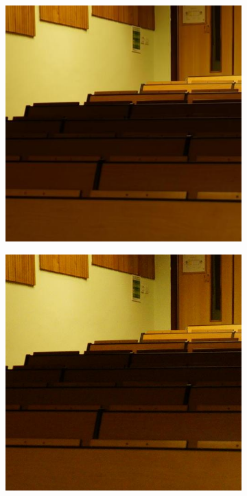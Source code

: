 \begin{figure}
    \hfill
    \begin{subfigure}[t]{0.24\textwidth}
        \centering
        \includegraphics[width=1\textwidth]{images/dataset/Sony_3-5_200_1600_classroom_14_mean.JPG}
    \end{subfigure}
    \hfill
    \begin{subfigure}[t]{0.24\textwidth}
        \centering
        \includegraphics[width=1\textwidth]{images/dataset/Sony_3-5_200_1600_classroom_14_real.JPG}

\end{subfigure}
\end{figure}
